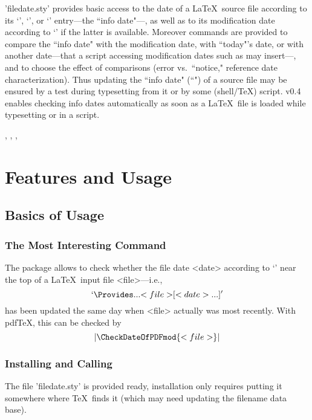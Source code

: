 \documentclass[fleqn]{article}%
\providecommand*{\pdfTeX}{pdf\TeX}
\begin{document}
\maketitle
\begin{MDabstract}
'filedate.sty' provides basic access to the date of a 
\LaTeX\ source file according to its `\ProvidesFile', 
`\ProvidesPackage', or `\ProvidesClass' entry---the ``info date"---, 
as well as to its modification date according to `\pdffilemoddate' 
if the latter is available. Moreover commands are provided
to compare the ``info date" with the modification date, with ``today"'s 
date, or with another date---that a script accessing modification dates 
such as 
may insert---, and to choose the effect of comparisons 
(error vs.\ ``notice," reference date characterization). 
Thus updating the ``info date" (``") 
of a source file may be ensured by a test 
during typesetting from it or by some (shell/\TeX) script.
v0.4 enables checking info dates automatically as soon as 
a \LaTeX\ file is loaded while typesetting or in a 
 script.

 , 
, , 
\end{MDabstract}
\tableofcontents

\section{Features and Usage}
\subsection{Basics of Usage}                        %
\subsubsection{The Most Interesting Command}
The package allows to check whether the file 
date <date> according to `\Provides' near the top of a \LaTeX\ 
input file <file>---i.e.,
\[`\Provides...{<file>}[<date> ...]'\]
has been updated the same day when <file> actually was  
most recently. With \pdfTeX, this can be checked by 
\[|\CheckDateOfPDFmod{<file>}|\]

\subsubsection{Installing and Calling}
The file 'filedate.sty' is provided ready, installation only requires
putting it somewhere where \TeX\ finds it
(which may need updating the filename data
 base).           %
\end{document}
